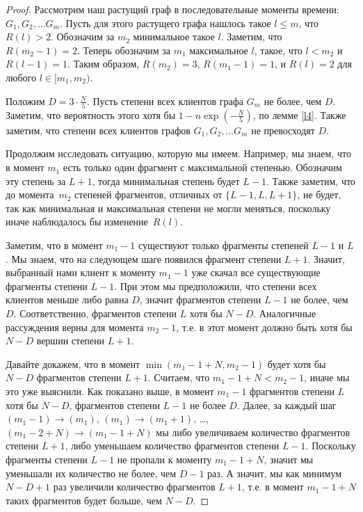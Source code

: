 \documentclass{matmex-diploma-custom}
\newcommand{\leqs}{\leqslant}
\theoremstyle{named}
\begin{document}
\begin{proof}
Рассмотрим наш растущий граф в последовательные моменты времени: $G_1, G_2, \dots G_m$. 
Пусть для этого растущего графа нашлось такое $l \leqs m$, что $ R(l) > 2$.
Обозначим за $m_2$ минимальное такое $l$. Заметим, что $R(m_2 - 1) = 2$. 
Теперь обозначим за $m_1$ максимальное $l$, такое, что $l < m_2$ и $R(l-1) = 1$.
Таким образом, $R(m_2) = 3$, $R(m_1 - 1) = 1$, и $R(l) = 2$ для любого $l \in [m_1, m_2)$.

Положим $D = 3 \cdot \frac{N}{5}$. Пусть степени всех клиентов графа $G_m$ не более, чем $D$. 
Заметим, что вероятность этого хотя бы $1 -  n\exp\left(-\frac{N}{5}\right)$, по лемме \ref{l4}.
Также заметим, что степени всех клиентов графов $G_1, G_2, \dots G_m$ не превосходят $D$.

Продолжим исследовать ситуацию, которую мы имеем. Например, мы знаем, что в момент $m_1$ есть 
только один фрагмент с максимальной степенью. Обозначим эту степень за $L + 1$, тогда минимальная степень будет $L - 1$.
Также заметим, что до момента~$m_2$ степеней фрагментов, отличных от $\{L-1, L, L+1\}$, не будет, 
так как минимальная и максимальная степени не могли меняться, поскольку иначе наблюдалось бы изменение~$R(l)$. 

Заметим, что в момент $m_1 - 1$ существуют только фрагменты степеней $L-1$ и $L$.
Мы знаем, что на следующем шаге появился фрагмент степени $L+1$. 
Значит, выбранный нами клиент к моменту $m_1 - 1$ уже скачал все существующие фрагменты степени $L-1$. 
При этом мы предположили, что степени всех клиентов меньше либо равна $D$, значит фрагментов степени $L-1$ не более, чем $D$.
Соответственно, фрагментов степени $L$ хотя бы $N - D$.
Аналогичные рассуждения верны для момента $m_2 - 1$, 
т.е. в этот момент должно быть хотя бы $N - D$ вершин степени $L+1$. 

Давайте докажем, что в момент $\min(m_1 - 1 + N, m_2 - 1)$ будет хотя бы $N-D$ фрагментов степени $L+1$.
Считаем, что $m_1 - 1 + N < m_2 - 1$, иначе мы это уже выяснили.
Как показано выше, в момент $m_1 - 1$ фрагментов степени $L$ хотя бы $N-D$, фрагментов степени $L - 1$ не более $D$. 
Далее, за каждый шаг $(m_1 - 1) \to (m_1)$, $(m_1) \to (m_1 + 1)$, \dots, $(m_1 - 2 + N) \to (m_1 - 1 + N)$ 
мы либо увеличиваем количество фрагментов степени $L+1$, либо уменьшаем количество фрагментов степени $L-1$.
Поскольку фрагменты степени $L-1$ не пропали к моменту $m_1 - 1 + N$, значит мы уменьшали их количество не более, чем $D - 1$ раз.
А значит, мы как минимум $N-D + 1$ раз увеличили количество фрагментов $L+1$, 
т.е. в момент $m_1 - 1 + N$ таких фрагментов будет больше, чем $N - D$.


\end{proof}
\end{document}
